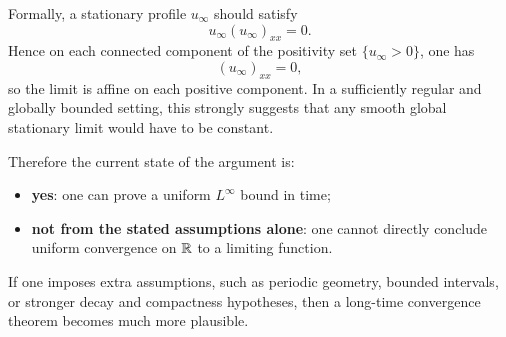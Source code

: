 Formally, a stationary profile $u_{\infty}$ should satisfy
\[
    u_{\infty}(u_{\infty})_{xx}=0.
\]
Hence on each connected component of the positivity set $\{u_{\infty}>0\}$, one has
\[
    (u_{\infty})_{xx}=0,
\]
so the limit is affine on each positive component. In a sufficiently regular and globally bounded setting, this strongly suggests that any smooth global stationary limit would have to be constant.

Therefore the current state of the argument is:
\begin{itemize}[leftmargin=2em]
    \item \textbf{yes}: one can prove a uniform $L^{\infty}$ bound in time;
    \item \textbf{not from the stated assumptions alone}: one cannot directly conclude uniform convergence on $\mathbb{R}$ to a limiting function.
\end{itemize}

If one imposes extra assumptions, such as periodic geometry, bounded intervals, or stronger decay and compactness hypotheses, then a long-time convergence theorem becomes much more plausible.
